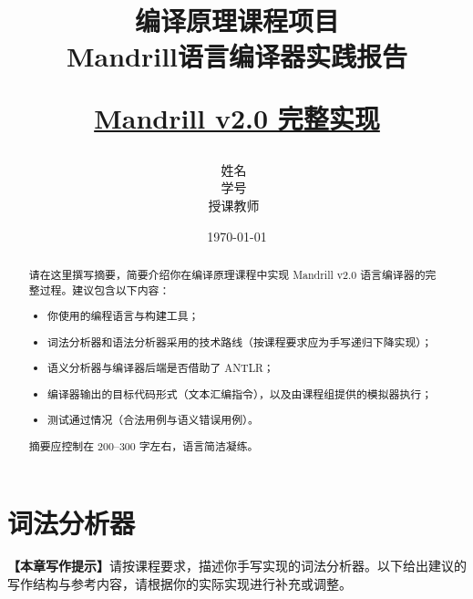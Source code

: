 \documentclass[12pt,hyperref,a4paper,UTF8]{ctexart}
\begin{document}
\title{ \vspace{3cm} \heiti \Huge \textbf{{编译原理课程项目\\Mandrill语言编译器实践报告}} \par
\vspace{1cm} 
\heiti \Large {\underline{Mandrill v2.0 完整实现}} \par   
\vspace{3cm} }%

\author{
    \vspace{0.5cm}
    \kaishu\Large 姓名\  \qquad \\ %
    \vspace{0.5cm}
    \kaishu\Large  学号\  \qquad  \\ %
    \vspace{0.5cm}
    \kaishu\Large   授课教师\  %
}
\date{\today} %

\cover

\thispagestyle{empty} 

\newpage
\tableofcontents

\newpage

\begin{abstract}
请在这里撰写摘要，简要介绍你在编译原理课程中实现 Mandrill v2.0 语言编译器的完整过程。建议包含以下内容：

\begin{itemize}
    \item 你使用的编程语言与构建工具；
    \item 词法分析器和语法分析器采用的技术路线（按课程要求应为手写递归下降实现）；
    \item 语义分析器与编译器后端是否借助了 ANTLR；
    \item 编译器输出的目标代码形式（文本汇编指令），以及由课程组提供的模拟器执行；
    \item 测试通过情况（合法用例与语义错误用例）。
\end{itemize}

摘要应控制在 200--300 字左右，语言简洁凝练。
\end{abstract}

\section{词法分析器}

\textbf{【本章写作提示】}请按课程要求，描述你手写实现的词法分析器。以下给出建议的写作结构与参考内容，请根据你的实际实现进行补充或调整。
\end{document}
